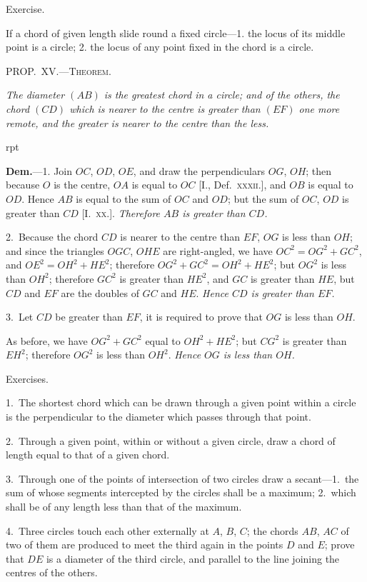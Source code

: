 \documentclass[oneside]{book}
\newcommand\mypropl[2]{
\bigskip\Needspace*{4\baselineskip}\begin{center}\textsc{#1}\end{center}
\hspace{\parindent}\emph{#2}\par\medskip
}
\newcommand\exhead[1]{
\Needspace*{5\baselineskip}\begin{center}
\textsf{#1}
\end{center}
}
\newcommand\imgflow[3]{
\setcounter{wrapwidth}{#1}
\begin{wrapfigure}[#2]{r}{\value{wrapwidth}pt}
\begin{center}
\vspace{-0.3in}
\end{center}
\end{wrapfigure}
}
\begin{document}
\exhead{Exercise.}

\begin{footnotesize}
If a chord of given length slide round a fixed circle---1. the
locus of its middle point is a circle; 2. the locus of any point
fixed in the chord is a circle.
\par\end{footnotesize}

\mypropl{PROP\@.~XV\@.---Theorem.}{The diameter $(AB)$ is the greatest chord in a circle;
and of the others, the chord $(CD)$ which is nearer to
the centre is greater than $(EF)$ one more remote, and
the greater is nearer to the centre than the less.}

\imgflow{120}{9}{f120}

\textbf{Dem.}---1. Join $OC$, $OD$, $OE$, and draw the perpendiculars
$OG$, $OH$; then because
$O$ is the centre, $OA$ is equal to
$OC$ [I., Def.~\textsc{xxxii.}]\label{Idefxxii}, and $OB$ is
equal to $OD$. Hence $AB$ is equal
to the sum of $OC$ and $OD$; but
the sum of $OC$, $OD$ is greater
than $CD$ [I.~\textsc{xx.}]. \emph{Therefore $AB$
is greater than $CD$.}

2.~Because the chord $CD$ is nearer to the centre
than $EF$, $OG$ is less than $OH$; and since the triangles
$OGC$, $OHE$ are right-angled, we have $OC^{2} = OG^{2} + GC^{2}$,
and $OE^{2} = OH^{2} + HE^{2}$; therefore $OG^{2} + GC^{2} = OH^{2} + HE^{2}$;
but $OG^{2}$ is less than $OH^{2}$; therefore $GC^{2}$ is greater
than $HE^{2}$, and $GC$ is greater than $HE$, but $CD$ and $EF$
are the doubles of $GC$ and $HE$. \emph{Hence $CD$ is greater
than $EF$.}

3.~Let $CD$ be greater than $EF$, it is required to
prove that $OG$ is less than $OH$.

As before, we have $OG^{2} + GC^{2}$ equal to $OH^{2} + HE^{2}$;
but $CG^{2}$ is greater than $EH^{2}$; therefore $OG^{2}$ is less
than $OH^{2}$. \emph{Hence $OG$ is less than $OH$.}

\exhead{Exercises.}

\begin{footnotesize}
1.~The shortest chord which can be drawn through a given
point within a circle is the perpendicular to the diameter which
passes through that point.

2.~Through a given point, within or without a given circle,
draw a chord of length equal to that of a given chord.

3.~Through one of the points of intersection of two circles
draw a secant---1.\ the sum of whose segments intercepted by the
circles shall be a maximum; 2.\ which shall be of any length
less than that of the maximum.

4.~Three circles touch each other externally at $A$, $B$, $C$; the
chords $AB$, $AC$ of two of them are produced to meet the third
again in the points $D$ and $E$; prove that $DE$ is a diameter of the
third circle, and parallel to the line joining the centres of the
others.
\par\end{footnotesize}
\end{document}
